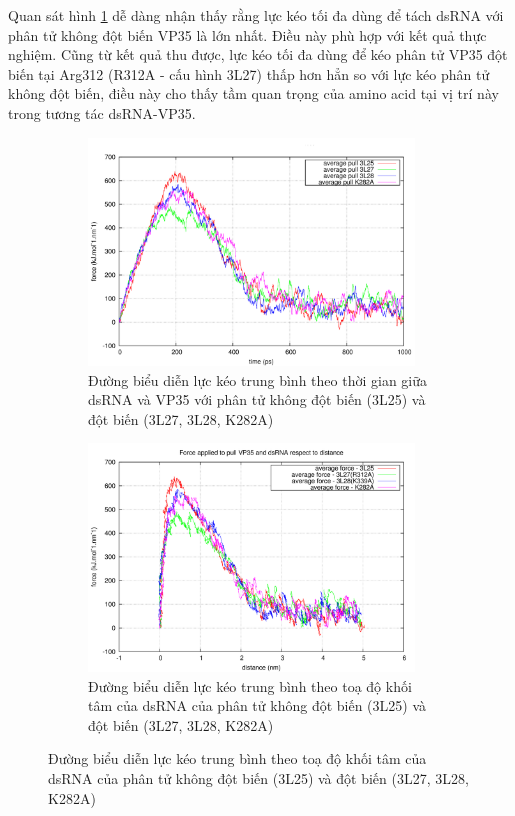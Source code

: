 \documentclass[12pt,a4paper,reqno, oneside]{book}
\begin{document}
Quan sát hình \ref{pullft} dễ dàng nhận thấy rằng lực kéo tối đa dùng để tách dsRNA với phân tử không đột biến VP35 là lớn nhất. Điều này phù hợp với kết quả thực nghiệm\cite{Leung2010}. Cũng từ kết quả thu được, lực kéo tối đa dùng để kéo phân tử VP35 đột biến tại Arg312 (\gls{R312A} - cấu hình 3L27) thấp hơn hẳn so với lực kéo phân tử không đột biến, điều này cho thấy tầm quan trọng của amino acid tại vị trí này trong tương tác dsRNA-VP35.
	\begin{figure}[t!]
	\centering
	\begin{subfigure}{0.95\textwidth}
	\includegraphics[width=0.95\textwidth,natwidth=610,natheight=642]{pullf}
	\caption{Đường biểu diễn lực kéo trung bình theo thời gian giữa dsRNA và VP35 với phân tử không đột biến (3L25) và đột biến (3L27, 3L28, \gls{K282A})}
	\label{pullft}
	\end{subfigure}
	\begin{subfigure}{0.95\textwidth}
	\centering
	\includegraphics[width=0.95\textwidth,natwidth=610,natheight=642]{pullfx}
	\caption{Đường biểu diễn lực kéo trung bình theo toạ độ khối tâm của dsRNA của phân tử không đột biến (3L25) và đột biến (3L27, 3L28, \gls{K282A})}
	\label{pullfx}
	\end{subfigure}
	\label{}
	\end{figure}
\end{document}
